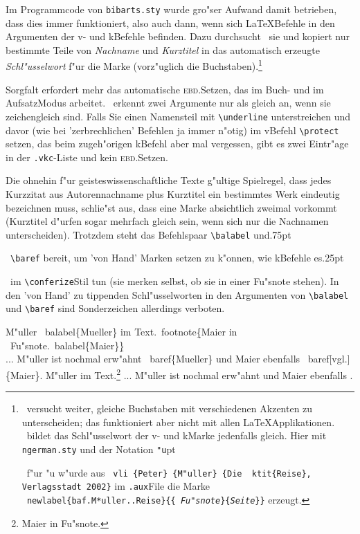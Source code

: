 \documentclass[12pt,a4paper]{article}
\newcommand{\pdfko}[1]{\kern #1pt
                          \strut\ignorespaces}%
\newcommand{\pbs}{\string\ \unskip}
\newcommand{\bs}{\protect\pbs}
\begin{document}
\noindent
Im Programmcode von \verb|bibarts.sty| wurde gro"ser Aufwand damit
betrieben, dass dies immer funktioniert, also auch dann, wenn sich
\LaTeX\hy Befehle in den Argumenten der 
v- und k\fhy Befehle befinden. Dazu durchsucht \BibArts\ sie und kopiert 
nur bestimmte Teile von \textit{Nachname} und \textit{Kurztitel} in das 
automatisch erzeugte \textit{Schl"usselwort} f"ur die Marke (vorz"uglich 
die Buchstaben).\footnote{\BibArts\ versucht weiter, gleiche Buchstaben 
mit verschiedenen Akzenten zu unterscheiden; das funktioniert aber nicht 
mit allen \LaTeX\hy Applikationen. \BibArts\ bildet das Schl"usselwort 
der v- und k\fhy Marke jedenfalls gleich. Hier mit \texttt{ngerman.sty} und
der Notation \texttt{\string"u}\pdfko{1.5}\ f"ur "u w"urde aus \texttt{\bs vli 
\{Peter\} \{M\string"uller\} \{Die \bs ktit\{Reise\}, Verlagsstadt 2002\}} 
im \texttt{.aux}\hy File die Marke 
\texttt{\bs newlabel\{baf.M*uller..Reise\}\{\{{\normalfont 
\textit{Fu"snote}}\}\{{\normalfont \textit{Seite}}\}\}} erzeugt.}

Sorgfalt erfordert mehr das automatische \textsc{ebd.}\hy Setzen, 
das im Buch- und im Aufsatz\hy Modus arbeitet. \BibArts\ erkennt zwei 
Argumente nur als gleich an, wenn sie zeichengleich sind. Falls Sie 
einen Namensteil mit \verb|\underline| unterstreichen und davor (wie
bei 'zerbrechlichen' Befehlen ja immer n"otig) im v\fhy Befehl 
\verb|\protect| setzen, das beim zugeh"origen k\fhy Befehl aber mal 
vergessen, gibt es zwei Eintr"age in der \verb|.vkc|-Liste und 
kein \textsc{ebd.}\hy Setzen.

Die ohnehin f"ur geisteswissenschaftliche Texte g"ultige Spielregel, dass 
jedes Kurzzitat aus Autorennachname plus Kurztitel ein bestimmtes Werk 
eindeutig bezeichnen muss, schlie"st aus, dass eine Marke absichtlich 
zweimal vorkommt (Kurztitel d"urfen sogar mehrfach gleich
sein, wenn sich nur die Nachnamen unterscheiden). Trotzdem steht 
das Befehlspaar \verb|\balabel| und\pdfko{.75}\ 
\verb|\baref| bereit, um 'von Hand' Marken setzen zu k"onnen, 
wie k\fhy Befehle es\pdfko{.25}\ 
im \verb|\conferize|\hy Stil tun (sie merken selbst, ob sie in einer 
Fu"snote stehen). In den 'von Hand' zu tippenden Schl"usselworten in den
Argumenten von \verb|\balabel| und \verb|\baref| sind Sonderzeichen 
allerdings verboten.

\Doppelbox
{M"uller \bs balabel\{Mueller\} im 
 Text.\bs footnote\b{\{}Maier in 
 \\ \ Fu"snote.\bs balabel\{Maier\}\b{\}}
 \\ ... M"uller ist nochmal erw"ahnt \bs baref\{Mueller\} 
 und Maier ebenfalls \bs baref[vgl.]\{Maier\}.
}
{M"uller  im 
 Text.\footnote{Maier in 
 Fu"snote.}
 ... M"uller ist nochmal erw"ahnt  
 und Maier ebenfalls .
}
\end{document}
